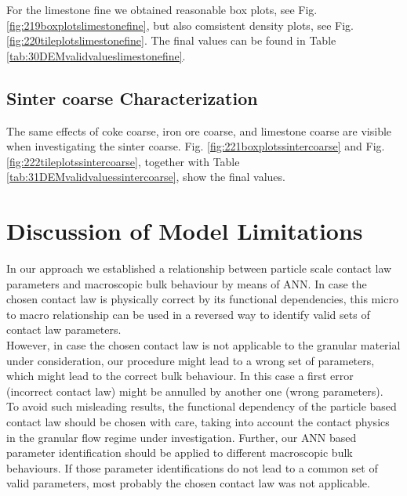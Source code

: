 For the limestone fine we obtained reasonable box plots, see Fig.
\ref{fig:219boxplotslimestonefine}, but also comsistent density plots, see Fig.
\ref{fig:220tileplotslimestonefine}.
The final values can be found in Table \ref{tab:30DEMvalidvalueslimestonefine}.


%


\subsection{Sinter coarse Characterization}
\label{subsec:sintercoarsecharacterization}

The same effects of coke coarse, iron ore coarse, and limestone coarse are
visible when investigating the sinter coarse.
Fig. \ref{fig:221boxplotssintercoarse} and Fig.
\ref{fig:222tileplotssintercoarse}, together with Table
\ref{tab:31DEMvalidvaluessintercoarse}, show the final values.



%

\section{Discussion of Model Limitations}
\label{sec:discussion}
In our approach we established a relationship between particle scale contact law
parameters and macroscopic bulk behaviour by means of \acs{ANN}. 
In case the chosen contact law is physically correct by its functional dependencies, 
this micro to macro relationship can be used in a reversed way to identify 
valid sets of contact law parameters.\\
However, in case the chosen contact law is not applicable to the granular 
material under consideration, 
our procedure might lead to a wrong set of parameters, which might lead to the
correct bulk behaviour.
In this case a first error (incorrect contact law) might be annulled by another
one (wrong parameters).\\
To avoid such misleading results, the functional dependency of the particle based contact 
law should be chosen with care, taking into account the contact physics in the granular 
flow regime under investigation. 
Further, our \acs{ANN} based parameter
identification should be applied to different macroscopic bulk behaviours. 
If those parameter identifications do not 
lead to a common set of valid parameters, most probably the chosen contact law was not applicable. 